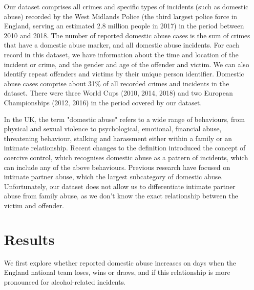 \documentclass[12pt, letterpaper]{article}
\begin{document}
Our dataset comprises all crimes and specific types of incidents (such as domestic abuse) recorded by the West Midlands Police (the third largest police force in England\autocite{Homeoffice}, serving an estimated 2.8 million people in 2017\autocite{populationfigure}) in the period between 2010 and 2018. The number of reported domestic abuse cases is the sum of crimes that have a domestic abuse marker, and all domestic abuse incidents. For each record in this dataset, we have information about the time and location of the incident or crime, and the gender and age of the offender and victim. We can also identify repeat offenders and victims by their unique person identifier. Domestic abuse cases comprise about 31\% of all recorded crimes and incidents in the dataset. There were three World Cups (2010, 2014, 2018) and two European Championships (2012, 2016) in the period covered by our dataset. 

In the UK, the term "domestic abuse" refers to a wide range of behaviours, from physical and sexual violence to psychological, emotional, financial abuse, threatening behaviour, stalking and harassment either within a family or an intimate relationship\autocite{ONS}. Recent changes to the definition introduced the concept of coercive control, which recognises domestic abuse as a pattern of incidents, which can include any of the above behaviours. Previous research have focused on intimate partner abuse, which the largest subcategory of domestic abuse. Unfortunately, our dataset does not allow us to differentiate intimate partner abuse from family abuse, as we don't know the exact relationship between the victim and offender. 

\section{Results}

We first explore whether reported domestic abuse increases on days when the England national team loses, wins or draws, and if this relationship is more pronounced for alcohol-related incidents.
\end{document}

